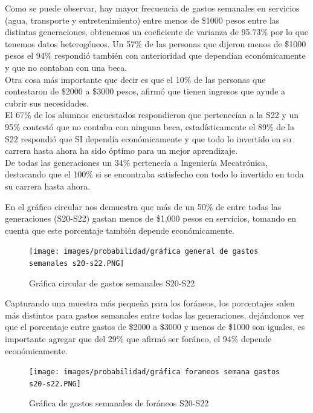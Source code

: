 \documentclass[letterpaper,12pt]{article}
\begin{document}
\begin{sloppypar}
Como se puede observar, hay mayor frecuencia de gastos semanales en servicios (agua, transporte y entretenimiento) entre menos de \$1000 pesos entre las distintas generaciones, obtenemos un coeficiente de varianza de 95.73\% por lo que tenemos datos heterogéneos. Un 57\% de las personas que dijeron menos de \$1000 pesos  el 94\% respondió también con anterioridad que dependían económicamente y que no contaban con una beca.
\vspace{0.3cm}\\
Otra cosa más importante que decir es que el 10\% de las personas que contestaron de \$2000 a \$3000 pesos, afirmó que tienen ingresos que ayude a cubrir sus necesidades. 
\vspace{0.3cm}\\
El 67\% de los alumnos encuestados respondieron que pertenecían a la S22 y un 95\% contestó que no contaba con ninguna beca, estadísticamente el 89\% de la S22 respondió que SI dependía económicamente y que todo lo invertido en su carrera hasta ahora ha sido óptimo para un mejor aprendizaje. 
\vspace{0.3cm}\\
De todas las generaciones un 34\% pertenecía a Ingeniería Mecatrónica, destacando que el 100\% si se encontraba satisfecho con todo lo invertido en toda su carrera hasta ahora. 

En el gráfico circular nos demuestra que más de un 50\% de entre todas las generaciones (S20-S22) gastan menos de \$1,000 pesos en servicios, tomando en cuenta que este porcentaje también depende económicamente.

\begin{figure}[H]
    \centering
    \texttt{[image: images/probabilidad/gráfica general de gastos semanales s20-s22.PNG]}
    \caption{Gráfica circular de gastos semanales S20-S22}
\end{figure}
Capturando una muestra más pequeña para los foráneos, los porcentajes salen más distintos para gastos semanales entre todas las generaciones, dejándonos ver que el porcentaje entre gastos de \$2000 a \$3000 y menos de \$1000 son iguales, es importante agregar que del 29\% que afirmó ser foráneo, el 94\% depende económicamente. 

\begin{figure}[H]
    \centering
    \texttt{[image: images/probabilidad/gráfica foraneos semana gastos s20-s22.PNG]}
    \caption{Gráfica de gastos semanales de foráneos S20-S22}
\end{figure}


\end{sloppypar}
\end{document}

